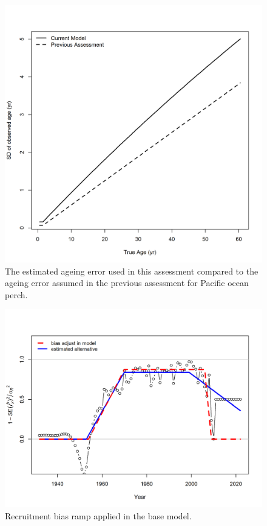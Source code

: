 \documentclass[12pt,]{article}
\begin{document}
\FloatBarrier 

\begin{figure}
\centering
\includegraphics{Figures/Ageing_Error.png}
\caption{The estimated ageing error used in this assessment compared to
the ageing error assumed in the previous assessment for Pacific ocean
perch. \label{fig:Age_Error}}
\end{figure}

\FloatBarrier 

\begin{figure}
\centering
\includegraphics{r4ss/plots_mod1/recruit_fit_bias_adjust.png}
\caption{Recruitment bias ramp applied in the base model.
\label{fig:bias_ramp}}
\end{figure}
\end{document}

